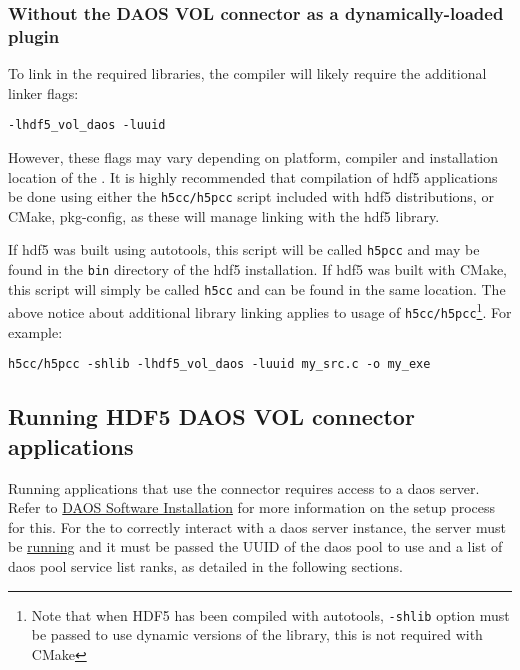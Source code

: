 \documentclass[../users_guide.tex]{subfiles}
\begin{document}
\subsubsection{Without the DAOS VOL connector as a dynamically-loaded plugin}

To link in the required libraries, the compiler will likely require the
additional linker flags:

\begin{verbatim}
-lhdf5_vol_daos -luuid
\end{verbatim}

However, these flags may vary depending on platform, compiler and installation
location of the \dvc{}. It is highly recommended that compilation
of \acrshort{hdf5} \dvc{} applications be done using either the
\texttt{h5cc/h5pcc} script included with \acrshort{hdf5} distributions, or CMake,
pkg-config, as these will manage linking with the \acrshort{hdf5} library.

If \acrshort{hdf5} was built using autotools, this script will be called \texttt{h5pcc} and
may be found in the \texttt{bin} directory of the \acrshort{hdf5} installation. If \acrshort{hdf5}
was built with CMake, this script will simply be called \texttt{h5cc} and can
be found in the same location. The above notice about additional library
linking applies to usage of \texttt{h5cc/h5pcc}\footnote{Note that when HDF5 has been
compiled with autotools, \texttt{-shlib} option must be passed to use dynamic versions
of the library, this is not required with CMake}. For example:
\begin{verbatim}
h5cc/h5pcc -shlib -lhdf5_vol_daos -luuid my_src.c -o my_exe
\end{verbatim}

\subsection{Running HDF5 DAOS VOL connector applications}
\label{running_daos_vol_apps}

Running applications that use the \dvc{} connector requires access to a \acrshort{daos}
server. Refer to
\href{https://daos-stack.github.io/admin/installation/}{DAOS Software Installation}
for more information on the setup process for this. For the \dvc{}
to correctly interact with a \acrshort{daos} server instance, the server must be \hyperref[sec:daos_serv_start]{running} and it must be passed the UUID of the
\acrshort{daos} pool to use and a list of \acrshort{daos} pool service list ranks, as detailed in the
following sections.
\end{document}
